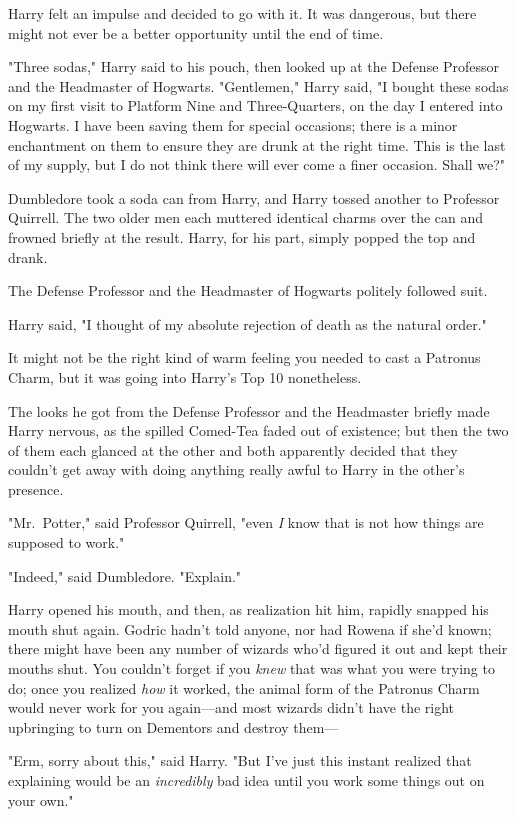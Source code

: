 Harry felt an impulse and decided to go with it. It was dangerous, but there 
might not ever be a better opportunity until the end of time.

"Three sodas," Harry said to his pouch, then looked up at the Defense Professor 
and the Headmaster of Hogwarts. "Gentlemen," Harry said, "I bought these sodas 
on my first visit to Platform Nine and Three-Quarters, on the day I entered 
into Hogwarts. I have been saving them for special occasions; there is a minor 
enchantment on them to ensure they are drunk at the right time. This is the 
last of my supply, but I do not think there will ever come a finer occasion. 
Shall we?"

Dumbledore took a soda can from Harry, and Harry tossed another to Professor 
Quirrell. The two older men each muttered identical charms over the can and 
frowned briefly at the result. Harry, for his part, simply popped the top and 
drank.

The Defense Professor and the Headmaster of Hogwarts politely followed suit.

Harry said, "I thought of my absolute rejection of death as the natural order."

It might not be the right kind of warm feeling you needed to cast a Patronus 
Charm, but it was going into Harry's Top 10 nonetheless.

The looks he got from the Defense Professor and the Headmaster briefly made 
Harry nervous, as the spilled Comed-Tea faded out of existence; but then the 
two of them each glanced at the other and both apparently decided that they 
couldn't get away with doing anything really awful to Harry in the other's 
presence.

"Mr.~Potter," said Professor Quirrell, "even \emph{I} know that is not how 
things are supposed to work."

"Indeed," said Dumbledore. "Explain."

Harry opened his mouth, and then, as realization hit him, rapidly snapped his 
mouth shut again. Godric hadn't told anyone, nor had Rowena if she'd known; 
there might have been any number of wizards who'd figured it out and kept their 
mouths shut. You couldn't forget if you \emph{knew} that was what you were 
trying to do; once you realized \emph{how} it worked, the animal form of the 
Patronus Charm would never work for you again---and most wizards didn't have 
the right upbringing to turn on Dementors and destroy them---

"Erm, sorry about this," said Harry. "But I've just this instant realized that 
explaining would be an \emph{incredibly} bad idea until you work some things 
out on your own."


